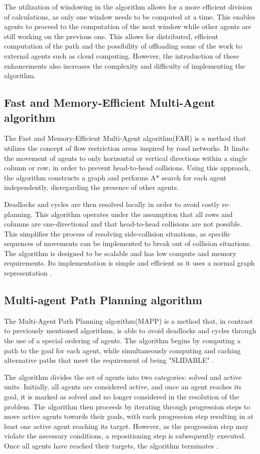 The utilization of windowing in the algorithm allows for a more efficient division of calculations, as only one window needs to be computed at a time. This enables agents to proceed to the computation of the next window while other agents are still working on the previous one. This allows for distributed, efficient computation of the path and the possibility of offloading some of the work to external agents such as cloud computing. However, the introduction of these enhancements also increases the complexity and difficulty of implementing the algorithm.


\subsection{Fast and Memory-Efficient Multi-Agent algorithm}
The Fast and Memory-Efficient Multi-Agent algorithm(FAR) is a method that utilizes the concept of flow restriction areas inspired by road networks. It limits the movement of agents to only horizontal or vertical directions within a single column or row, in order to prevent head-to-head collisions. Using this approach, the algorithm constructs a graph and performs A* search for each agent independently, disregarding the presence of other agents.

Deadlocks and cycles are then resolved locally in order to avoid costly re-planning. This algorithm operates under the assumption that all rows and columns are one-directional and that head-to-head collisions are not possible. This simplifies the process of resolving side-collision situations, as specific sequences of movements can be implemented to break out of collision situations. The algorithm is designed to be scalable and has low compute and memory requirements. Its implementation is simple and efficient as it uses a normal graph representation \cite{far}.

\subsection{Multi-agent Path Planning algorithm}
The Multi-Agent Path Planning algorithm(MAPP) is a method that, in contrast to previously mentioned algorithms, is able to avoid deadlocks and cycles through the use of a special ordering of agents. The algorithm begins by computing a path to the goal for each agent, while simultaneously computing and caching alternative paths that meet the requirement of being "SLIDABLE" \cite{mapp_algo}. 

The algorithm divides the set of agents into two categories: solved and active units. Initially, all agents are considered active, and once an agent reaches its goal, it is marked as solved and no longer considered in the resolution of the problem. The algorithm then proceeds by iterating through progression steps to move active agents towards their goals, with each progression step resulting in at least one active agent reaching its target. However, as the progression step may violate the necessary conditions, a repositioning step is subsequently executed. Once all agents have reached their targets, the algorithm terminates \cite{mapp_algo}.